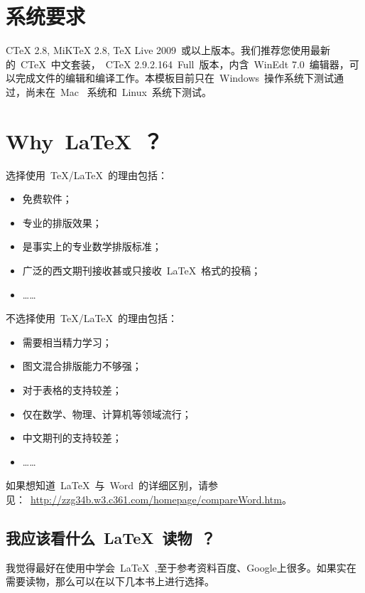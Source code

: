 \section{系统要求}

     CTeX 2.8, MiKTeX 2.8, TeX Live 2009~或以上版本。我们推荐您使用最新的~CTeX~中文套装，~CTeX 2.9.2.164~Full~版本，内含~WinEdt 7.0~编辑器，可以完成文件的编辑和编译工作。本模板目前只在~Windows~操作系统下测试通过，尚未在~Mac~ 系统和~Linux~系统下测试。

\section{Why~\LaTeX~？}

选择使用~\TeX/\LaTeX~的理由包括：
\begin{itemize}
\item 免费软件；
\item 专业的排版效果；
\item 是事实上的专业数学排版标准；
\item 广泛的西文期刊接收甚或只接收~\LaTeX~格式的投稿；
\item[] ……
\end{itemize}
不选择使用~\TeX/\LaTeX~的理由包括：
\begin{itemize}
\item 需要相当精力学习；
\item 图文混合排版能力不够强；
\item 对于表格的支持较差；
\item 仅在数学、物理、计算机等领域流行；
\item 中文期刊的支持较差；
\item[] ……
\end{itemize}

如果想知道~\LaTeX~与~Word~的详细区别，请参见：~\url{http://zzg34b.w3.c361.com/homepage/compareWord.htm}。

\subsection{我应该看什么~\LaTeX~读物~？}

我觉得最好在使用中学会~\LaTeX~,至于参考资料百度、Google上很多。如果实在需要读物，那么可以在以下几本书上进行选择。

